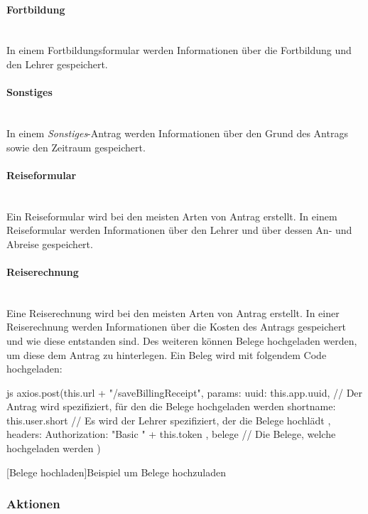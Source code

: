 \paragraph{Fortbildung}~\\
In einem Fortbildungsformular werden Informationen über die Fortbildung und den Lehrer gespeichert.
\paragraph{Sonstiges}~\\
In einem \textit{Sonstiges}-Antrag werden Informationen über den Grund des Antrags sowie den Zeitraum gespeichert.
\paragraph{Reiseformular}~\\
Ein Reiseformular wird bei den meisten Arten von Antrag erstellt. In einem Reiseformular werden Informationen über den Lehrer und über dessen An- und Abreise gespeichert.
\paragraph{Reiserechnung}~\\
Eine Reiserechnung wird bei den meisten Arten von Antrag erstellt. In einer Reiserechnung werden Informationen über die Kosten des Antrags gespeichert und wie diese entstanden sind. Des weiteren können Belege hochgeladen werden, um diese dem Antrag zu hinterlegen. Ein Beleg wird mit folgendem Code hochgeladen:
\begin{code}{js}
	axios.post(this.url + "/saveBillingReceipt",
	{
		params: {
			uuid: this.app.uuid, // Der Antrag wird spezifiziert, für den die Belege hochgeladen werden
			shortname: this.user.short // Es wird der Lehrer spezifiziert, der die Belege hochlädt
		}
	},
	{
		headers: {
			Authorization: "Basic " + this.token
		}
	},
	belege // Die Belege, welche hochgeladen werden
	)
\end{code}
[Belege hochladen]{Beispiel um Belege hochzuladen}~
\newpage
\subsubsection{Aktionen}

